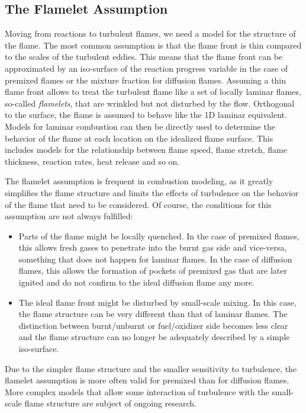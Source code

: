 \subsection{The Flamelet Assumption} %
\label{sub:the_flamelet_assumption}
%
Moving from reactions to turbulent flames, we need a model for the structure
of the flame.
%
The most common assumption is that the flame front is thin compared to the
scales of the turbulent eddies.
%
This means that the flame front can be approximated by an iso-surface of the
reaction progress variable in the case of premixed flames or the mixture
fraction for diffusion flames.
%
Assuming a thin flame front allows to treat the turbulent flame like a set of
locally laminar flames, so-called \emph{flamelets}, that are wrinkled but not
disturbed by the flow.
%
Orthogonal to the surface, the flame is assumed to behave like the
\ac{1D} laminar equivalent.
%
Models for laminar combustion can then be directly used to determine the
behavior of the flame at each location on the idealized flame surface.
%
This includes models for the relationship between flame speed, flame stretch,
flame thickness, reaction rates, heat release and so on.
%

%
The flamelet assumption is frequent in combustion modeling, as it greatly
simplifies the flame structure and limits the effects of turbulence on the
behavior of the flame that need to be considered.
%
Of course, the conditions for this assumption are not always fulfilled:
%
\begin{itemize}
    \item
    Parts of the flame might be locally quenched.
    In the case of premixed flames, this allows fresh gases to penetrate into
    the burnt gas side and vice-versa, something that does not happen for
    laminar flames.
    In the case of diffusion flames, this allows the formation of pockets of
    premixed gas that are later ignited and do not confirm to the ideal
    diffusion flame any more.
    \item
    The ideal flame front might be disturbed by small-scale mixing.
    In this case, the flame structure can be very different than that of laminar
    flames.
    The distinction between burnt/unburnt or fuel/oxidizer side becomes less
    clear and the flame structure can no longer be adequately described by a
    simple iso-surface.
\end{itemize}
%
Due to the simpler flame structure and the smaller sensitivity to turbulence,
the flamelet assumption is more often valid for premixed than for diffusion
flames.
%
More complex models that allow some interaction of turbulence with the
small-scale flame structure are subject of ongoing research.
%
%
